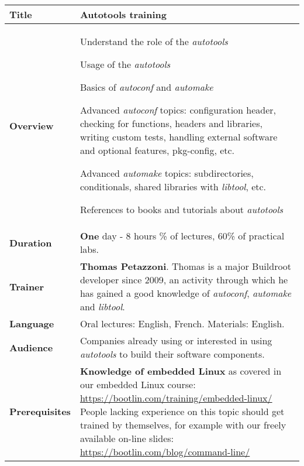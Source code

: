 \documentclass[a4paper,12pt,obeyspaces,spaces,hyphens]{article}
\begin{document}
\feshowtitle

\small

 {
  \begin{tabularx}{\textwidth}{|g|h|}
    {\bf Title} & {\bf Autotools training} \\
    \hline

    {\bf Overview} &
    Understand the role of the {\em autotools} \par
    Usage of the {\em autotools} \par
    Basics of {\em autoconf} and {\em automake} \par
    Advanced {\em autoconf} topics: configuration header, checking for
    functions, headers and libraries, writing custom tests, handling
    external software and optional features, pkg-config, etc. \par
    Advanced {\em automake} topics: subdirectories, conditionals,
    shared libraries with {\em libtool}, etc. \par
    References to books and tutorials about {\em autotools}\\
    \hline

    {\bf Duration} & {\bf One} day - 8 hours
    \% of lectures, 60\% of practical labs. \\
    \hline

    {\bf Trainer} & {\bf Thomas Petazzoni}. Thomas is a major
    Buildroot developer since 2009, an activity through which he has
    gained a good knowledge of {\em autoconf}, {\em automake} and {\em
      libtool}.\\
    \hline

    {\bf Language} & Oral lectures: English, French.
    \newline Materials: English.\\
    \hline

    {\bf Audience} & Companies already using or interested in using
    {\em autotools} to build their software components.\\
    \hline

    {\bf Prerequisites} & {\bf Knowledge of embedded Linux} as covered
    in our embedded Linux course:
    \newline \url{https://bootlin.com/training/embedded-linux/} \vspace{1em}
    \newline People lacking experience on this topic should get
    trained by themselves, for example with our freely available on-line slides:
    \newline \url{https://bootlin.com/blog/command-line/} \\
    \hline
  \end{tabularx}

}
\end{document}
